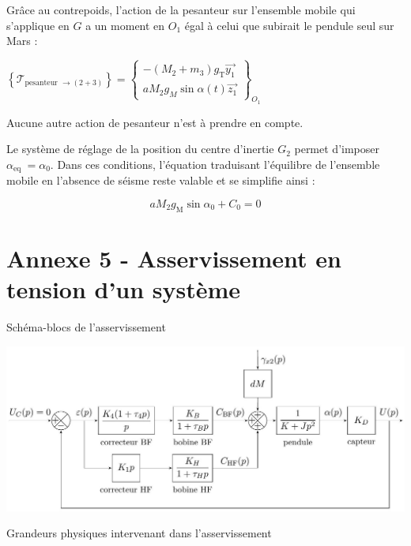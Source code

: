 \documentclass[10pt]{article}
\begin{document}
Grâce au contrepoids, l'action de la pesanteur sur l'ensemble mobile qui s'applique en $G$ a un moment en $O_{1}$ égal à celui que subirait le pendule seul sur Mars :

$\left\{\mathcal{T}_{\text {pesanteur } \rightarrow(2+3)}\right\}=\left\{\begin{array}{c}-\left(M_{2}+m_{3}\right) g_{\mathrm{T}} \overrightarrow{y_{1}} \\ a M_{2} g_{M} \sin \alpha(t) \overrightarrow{z_{1}}\end{array}\right\}_{O_{1}}$

Aucune autre action de pesanteur n'est à prendre en compte.

Le système de réglage de la position du centre d'inertie $G_{2}$ permet d'imposer $\alpha_{\text {eq }}=\alpha_{0}$. Dans ces conditions, l'équation traduisant l'équilibre de l'ensemble mobile en l'absence de séisme reste valable et se simplifie ainsi :


\begin{equation*}
a M_{2} g_{\mathrm{M}} \sin \alpha_{0}+C_{0}=0 \tag{eq.1'}
\end{equation*}


\section*{Annexe 5 - Asservissement en tension d'un système}
Schéma-blocs de l'asservissement

\begin{center}
\includegraphics[max width=\textwidth]{2024_04_26_3285cfc264024262add0g-19}
\end{center}

Grandeurs physiques intervenant dans l'asservissement
\end{document}
